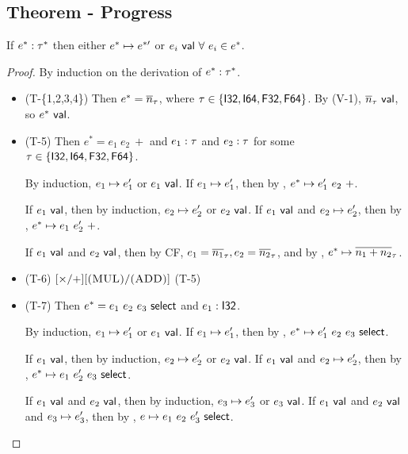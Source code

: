 \documentclass{article}
\begin{document}
\subsection{Theorem - Progress}
If $e^* : \tau^*$ then either $e^*\mapsto e^{*\prime}$ or $e_i ~\mathsf{val}~ \forall~ e_i \in e^*$.
\begin{proof}
    By induction on the derivation of $e^* : \tau^*$.
    \begin{itemize}
        \item (T-\{1,2,3,4\})
            Then $e^* = \overline{n}_\tau$, where $\tau \in \{\mathsf{I32}, \mathsf{I64}, \mathsf{F32}, \mathsf{F64}\}$.
            By (V-1), $\overline{n}_\tau ~\mathsf{val}$, so $e^* ~\mathsf{val}$.
        
        \item (T-5)
            Then $e^* = e_1~ e_2~ +$ and $e_1 : \tau$ and $e_2 : \tau$ for some $\tau \in \{\mathsf{I32}, \mathsf{I64}, \mathsf{F32}, \mathsf{F64}\}$.
            
            By induction, $e_1 \mapsto e_1'$ or $e_1 ~\mathsf{val}$.
            If $e_1 \mapsto e_1'$, then by , $e^* \mapsto e_1'~ e_2~ +$.
            
            If $e_1 ~\mathsf{val}$, then by induction, $e_2 \mapsto e_2'$ or $e_2 ~\mathsf{val}$.
            If $e_1 ~\mathsf{val}$ and $e_2 \mapsto e_2'$, then by , $e^* \mapsto e_1~ e_2'~ +$.
            
            If $e_1 ~\mathsf{val}$ and $e_2 ~\mathsf{val}$, then by CF, $e_1 = \overline{n_1}_\tau, e_2 = \overline{n_2}_\tau$, and by , $e^* \mapsto \overline{n_1 + n_2}_\tau$.
        
        \item (T-6)
            $[\times / +][\textsc{(MUL)} / \textsc{(ADD)}]$ (T-5)
        
        \item (T-7)
            Then $e^* = e_1 ~ e_2 ~ e_3 ~ \mathsf{select}$ and $e_1 : \mathsf{I32}$. %
            
            By induction, $e_1 \mapsto e_1'$ or $e_1 ~\mathsf{val}$.
            If $e_1 \mapsto e_1'$, then by , $e^* \mapsto e_1' ~ e_2 ~ e_3 ~ \mathsf{select}$.
            
            If $e_1 ~\mathsf{val}$, then by induction, $e_2 \mapsto e_2'$ or $e_2 ~\mathsf{val}$.
            If $e_1 ~\mathsf{val}$ and $e_2 \mapsto e_2'$, then by , $e^* \mapsto e_1 ~ e_2' ~ e_3 ~ \mathsf{select}$.
            
            If $e_1 ~\mathsf{val}$ and $e_2 ~\mathsf{val}$, then by induction, $e_3 \mapsto e_3'$ or $e_3 ~\mathsf{val}$.
            If $e_1 ~\mathsf{val}$ and $e_2 ~\mathsf{val}$ and $e_3 \mapsto e_3'$, then by , $e \mapsto e_1 ~ e_2 ~ e_3' ~ \mathsf{select}$.
            

\end{itemize}
\end{proof}
\end{document}
